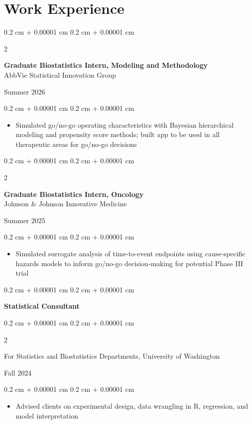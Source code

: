 \documentclass[10pt, letterpaper]{article}
\newenvironment{highlights}{
    \begin{itemize}[
        topsep=0.10 cm,
        parsep=0.10 cm,
        partopsep=0pt,
        itemsep=0pt,
        leftmargin=0.4 cm + 10pt
    ]
}{
    \end{itemize}
} %
\newenvironment{onecolentry}{
    \begin{adjustwidth}{
        0.2 cm + 0.00001 cm
    }{
        0.2 cm + 0.00001 cm
    }
}{
    \end{adjustwidth}
    \vspace{0.2cm} %
}
\newenvironment{twocolentry}[2][]{
    \onecolentry
    \def\secondColumn{#2}
    \setcolumnwidth{\fill, 4.5 cm}
    \begin{paracol}{2}
}{
    \switchcolumn \raggedleft \secondColumn
    \end{paracol}
    \endonecolentry
}
\begin{document}
\section{Work Experience}

\begin{twocolentry}{Summer 2026}
    \textbf{Graduate Biostatistics Intern, Modeling and Methodology} \\
    AbbVie Statistical Innovation Group
\end{twocolentry}
\begin{onecolentry}
    \begin{highlights}
    \item[] Simulated go/no-go operating characteristics with Bayesian hierarchical modeling and propensity score methods; built app to be used in all therapeutic areas for go/no-go decisions
    \end{highlights}
\end{onecolentry}

\vspace{0.2cm}

\begin{twocolentry}{Summer 2025}
    \textbf{Graduate Biostatistics Intern, Oncology} \\
    Johnson \& Johnson Innovative Medicine
\end{twocolentry}
\begin{onecolentry}
    \begin{highlights}
    \item[] Simulated surrogate analysis of time-to-event endpoints using cause-specific hazards models to inform go/no-go decision-making for potential Phase III trial
    \end{highlights}
\end{onecolentry}

\vspace{0.2cm}








\begin{onecolentry}
\textbf{Statistical Consultant}
\end{onecolentry} 
\begin{twocolentry}{Fall 2024}
For Statistics and Biostatistics Departments, University of Washington
\end{twocolentry}
\begin{onecolentry}
\begin{highlights}
\item[] Advised clients on experimental design, data wrangling in R, regression, and model interpretation
\end{highlights}
\end{onecolentry}
\end{document}
